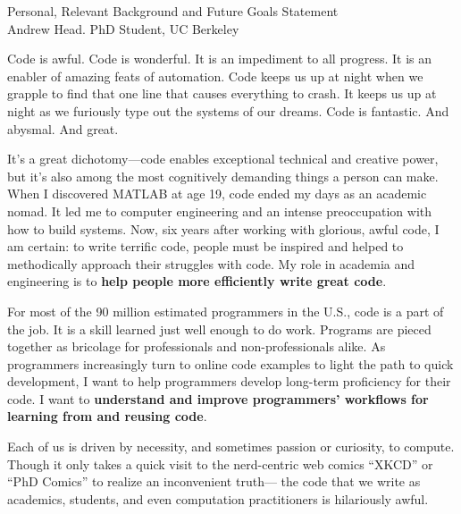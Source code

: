 \documentclass[12pt]{memoir}
\title{}
\author{Andrew Head}
\begin{document}
\begin{center}
Personal, Relevant Background and Future Goals Statement \\
Andrew Head. PhD Student, UC Berkeley
\end{center}
\vspace{-1ex}


Code is awful.
Code is wonderful.
It is an impediment to all progress.
It is an enabler of amazing feats of automation.
Code keeps us up at night when we grapple to find that one line that causes everything to crash.
It keeps us up at night as we furiously type out the systems of our dreams.
Code is fantastic.
And abysmal.
And great.

It's a great dichotomy---code enables exceptional technical and creative power, but it's also among the most cognitively demanding things a person can make.
When I discovered MATLAB at age 19, code ended my days as an academic nomad.
It led me to computer engineering and an intense preoccupation with how to build systems.
Now, six years after working with glorious, awful code, I am certain:
to write terrific code, people must be inspired and helped to methodically approach their struggles with code.
My role in academia and engineering is to \textbf{help people more efficiently write great code}.

For most of the 90 million estimated programmers in the U.S., code is a part of the job.
It is a skill learned just well enough to do work.
Programs are pieced together as bricolage for professionals and non-professionals alike.
As programmers increasingly turn to online code examples to light the path to quick development, I want to help programmers develop long-term proficiency for their code.
I want to \textbf{understand and improve programmers' workflows for learning from and reusing code}.

Each of us is driven by necessity, and sometimes passion or curiosity, to compute.
Though it only takes a quick visit to the nerd-centric web comics ``XKCD'' or ``PhD Comics'' to realize an inconvenient truth---
the code that we write as academics, students, and even computation practitioners is hilariously awful.
\fi
\end{document}

